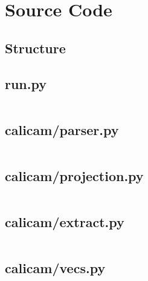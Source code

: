 \clearpage
\section{Source Code}

\subsection*{Structure}

\singlespacing

\subsection*{run.py} \label{code:run}
\inputminted{python}{./calicam/run.py}

\subsection*{calicam/parser.py} \label{code:parser}
\inputminted{python}{./calicam/calicam/parser.py}

\subsection*{calicam/projection.py} \label{code:projection}
\inputminted{python}{./calicam/calicam/projection.py}

\subsection*{calicam/extract.py} \label{code:extract}
\inputminted{python}{./calicam/calicam/extract.py}

\subsection*{calicam/vecs.py} \label{code:vecsZ}
\inputminted{python}{./calicam/calicam/vecs.py}

\onehalfspacing
